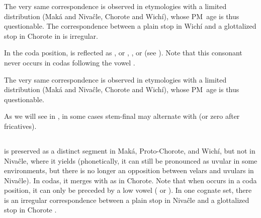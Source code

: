 The very same correspondence is observed in etymologies with a limited distribution (Maká and Nivaĉle, Chorote and Wichí), whose PM~age is thus questionable. The correspondence between a plain stop in Wichí and a glottalized stop in Chorote in  is irregular.

\begin{exe}
    \ex \hunger
    \ex \lizard
    \ex \fry
    \ex \redv
    \ex \torn
    \ex \grandchild
    \ex \heavyv
    \ex \locustcw
    \ex \hole
    \ex \tortoise
    \ex \whitealgarrobof
    \ex \runv
    \ex \chaguark \label{k-chaguark}
    \ex \kidney
    \ex \willow
    \ex \medicine
    \ex \precipice
    \ex \metal
\end{exe}

In the coda position,  is reflected as ,  or , ,  or  (see ). Note that this consonant never occurs in codas following the vowel .

\begin{exe}
    \ex \honeycomb
    \ex \goaway
    \ex \mortar
    \ex \hidev
    \ex \palm
    \ex \thread
    \ex \yicalhuk
    \ex \powder
    \ex \feces
    \ex \zorzal
    \ex \wildmanioc
    \ex \rope
    \ex \fence
    \ex \cat
    \ex \river
    \ex \plate
    \ex \blind
    \ex \unclesg
    \ex \duraznillo
    \ex \leniosasg
    \ex \badmood
    \ex \allrcpr
    \ex \headn
    \ex \straw
    \ex \palosanto
    \ex \firewoodhuk
    \ex \wildhoney
    \ex \eatvi
\end{exe}

The very same correspondence is observed in etymologies with a limited distribution (Maká and Nivaĉle, Chorote and Wichí), whose PM~age is thus questionable.

\begin{exe}
    \ex \tobacco
    \ex \arrowfok
    \ex \two
    \ex \bilecw
    \ex \silkfloss
    \ex \temperance
    \ex \cebil
    \ex \paralytic
    \ex \queenpalmf
\end{exe}

As we will see in , in some cases stem-final  may alternate with  (or zero after fricatives).

\subsection{}\label{proto-q}
 is preserved as a distinct segment in Maká, Proto-Chorote, and Wichí, but not in Nivaĉle, where it yields  (phonetically, it can still be pronounced as uvular in some environments, but there is no longer an opposition between velars and uvulars in Nivaĉle). In codas, it merges with  as  in Chorote. Note that when  occurs in a coda position, it can only be preceded by a low vowel ( or ). In one cognate set, there is an irregular correspondence between a plain stop in Nivaĉle and a glottalized stop in Chorote .

